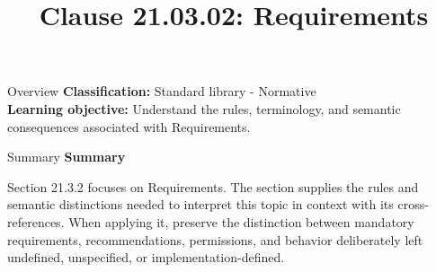 \documentclass[10pt,letterpaper]{article}
\title{Clause 21.03.02: Requirements}
\author{}
\date{}
\begin{document}
\maketitle
\begin{CornellOverviewBox}{Overview}
\textbf{Classification:} Standard library - Normative\\[2pt]
\textbf{Learning objective:} Understand the rules, terminology, and semantic consequences associated with Requirements.
\end{CornellOverviewBox}\begin{CornellSummaryBox}{Summary}
{\sffamily\bfseries\color{Accent} Summary}\par\vspace{3pt}Section 21.3.2 focuses on Requirements. The section supplies the rules and semantic distinctions needed to interpret this topic in context with its cross-references. When applying it, preserve the distinction between mandatory requirements, recommendations, permissions, and behavior deliberately left undefined, unspecified, or implementation-defined.
\end{CornellSummaryBox}
\end{document}
